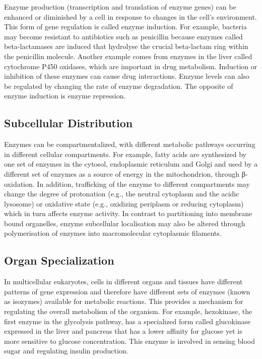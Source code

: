 Enzyme production (transcription and translation of enzyme genes) can be enhanced or diminished by a cell in response to changes in the cell's environment. This form of gene regulation is called enzyme induction. For example, bacteria may become resistant to antibiotics such as penicillin because enzymes called beta-lactamases are induced that hydrolyse the crucial beta-lactam ring within the penicillin molecule. Another example comes from enzymes in the liver called cytochrome P450 oxidases, which are important in drug metabolism. Induction or inhibition of these enzymes can cause drug interactions. Enzyme levels can also be regulated by changing the rate of enzyme degradation. The opposite of enzyme induction is enzyme repression.

\hypertarget{subcellular-distribution}{%
\subsection{Subcellular Distribution}\label{subcellular-distribution}}

Enzymes can be compartmentalized, with different metabolic pathways occurring in different cellular compartments. For example, fatty acids are synthesized by one set of enzymes in the cytosol, endoplasmic reticulum and Golgi and used by a different set of enzymes as a source of energy in the mitochondrion, through β-oxidation. In addition, trafficking of the enzyme to different compartments may change the degree of protonation (e.g., the neutral cytoplasm and the acidic lysosome) or oxidative state (e.g., oxidizing periplasm or reducing cytoplasm) which in turn affects enzyme activity. In contrast to partitioning into membrane bound organelles, enzyme subcellular localisation may also be altered through polymerisation of enzymes into macromolecular cytoplasmic filaments.

\hypertarget{organ-specialization}{%
\subsection{Organ Specialization}\label{organ-specialization}}

In multicellular eukaryotes, cells in different organs and tissues have different patterns of gene expression and therefore have different sets of enzymes (known as isozymes) available for metabolic reactions. This provides a mechanism for regulating the overall metabolism of the organism. For example, hexokinase, the first enzyme in the glycolysis pathway, has a specialized form called glucokinase expressed in the liver and pancreas that has a lower affinity for glucose yet is more sensitive to glucose concentration. This enzyme is involved in sensing blood sugar and regulating insulin production.

